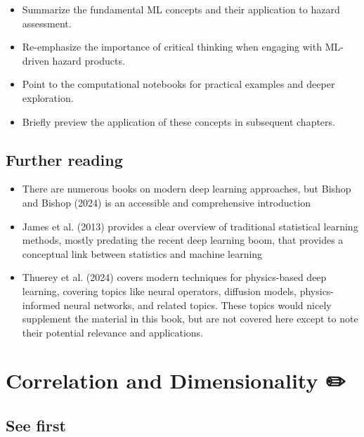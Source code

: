 \documentclass[
  letterpaper,
  DIV=11,
  numbers=noendperiod]{scrreprt}
\providecommand{\tightlist}{%
  \setlength{\itemsep}{0pt}\setlength{\parskip}{0pt}}
\begin{document}

\begin{itemize}
\tightlist
\item
  Summarize the fundamental ML concepts and their application to hazard
  assessment.
\item
  Re-emphasize the importance of critical thinking when engaging with
  ML-driven hazard products.
\item
  Point to the computational notebooks for practical examples and deeper
  exploration.
\item
  Briefly preview the application of these concepts in subsequent
  chapters.
\end{itemize}

\section*{Further reading}\label{further-reading-4}


\begin{itemize}
\tightlist
\item
  There are numerous books on modern deep learning approaches, but
  Bishop and Bishop (2024) is an accessible and comprehensive
  introduction
\item
  James et al. (2013) provides a clear overview of traditional
  statistical learning methods, mostly predating the recent deep
  learning boom, that provides a conceptual link between statistics and
  machine learning
\item
  Thuerey et al. (2024) covers modern techniques for physics-based deep
  learning, covering topics like neural operators, diffusion models,
  physics-informed neural networks, and related topics. These topics
  would nicely supplement the material in this book, but are not covered
  here except to note their potential relevance and applications.
\end{itemize}

\chapter{Correlation and Dimensionality
✏️}\label{correlation-and-dimensionality}

\section*{See first}\label{see-first-3}
\end{document}
